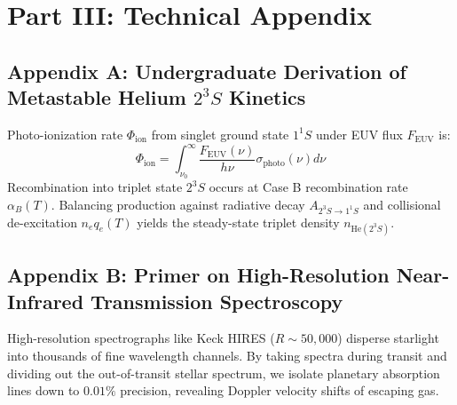 \documentclass[11pt,a4paper]{article}
\begin{document}
\newpage

\section*{Part III: Technical Appendix}

\subsection*{Appendix A: Undergraduate Derivation of Metastable Helium $2^3S$ Kinetics}
Photo-ionization rate $\Phi_{\text{ion}}$ from singlet ground state $1^1S$ under EUV flux $F_{\text{EUV}}$ is:
\begin{equation}
\Phi_{\text{ion}} = \int_{\nu_0}^{\infty} \frac{F_{\text{EUV}}(\nu)}{h\nu} \sigma_{\text{photo}}(\nu) d\nu
\end{equation}
Recombination into triplet state $2^3S$ occurs at Case B recombination rate $\alpha_B(T)$. Balancing production against radiative decay $A_{2^3S \to 1^1S}$ and collisional de-excitation $n_e q_e(T)$ yields the steady-state triplet density $n_{\text{He}(2^3S)}$.

\subsection*{Appendix B: Primer on High-Resolution Near-Infrared Transmission Spectroscopy}
High-resolution spectrographs like Keck HIRES ($R \sim 50,000$) disperse starlight into thousands of fine wavelength channels. By taking spectra during transit and dividing out the out-of-transit stellar spectrum, we isolate planetary absorption lines down to $0.01\%$ precision, revealing Doppler velocity shifts of escaping gas.
\end{document}
